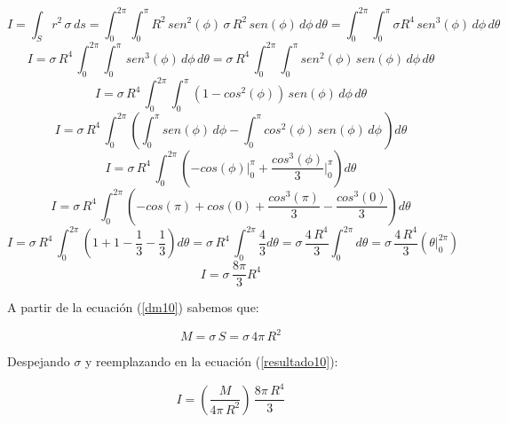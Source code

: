 \documentclass[letter,oneside,11pt]{article}
\begin{document}
\begin{equation*}
    I = \int_{S} r^2\, \sigma\, ds = \int_{0}^{2\pi} \int_{0}^{\pi} R^2\, sen^2(\phi)\, \sigma\, R^2\, sen (\phi)\, d\phi\, d\theta = \int_{0}^{2\pi} \int_{0}^{\pi} \sigma R^4\, sen^3(\phi)\, d\phi\, d\theta
\end{equation*}
\begin{equation*}
    I = \sigma\, R^4\, \int_{0}^{2\pi} \int_{0}^{\pi}\, sen^3(\phi)\, d\phi\, d\theta = \sigma\, R^4\, \int_{0}^{2\pi} \int_{0}^{\pi} sen^2(\phi)\, sen(\phi)\, d\phi\, d\theta
\end{equation*}
\begin{equation*}
    I = \sigma\, R^4\, \int_{0}^{2\pi} \int_{0}^{\pi} (1 - cos^2(\phi))\, sen(\phi)\, d\phi\, d\theta
\end{equation*}
\begin{equation*}
    I = \sigma\, R^4\, \int_{0}^{2\pi} \left( \int_{0}^{\pi} sen(\phi)\, d\phi - \int_{0}^{\pi} cos^2(\phi)\, sen(\phi)\, d\phi\, \right) d\theta
\end{equation*}
\begin{equation*}
    I = \sigma\, R^4\, \int_{0}^{2\pi} \left( -cos(\phi)\Biggr|_{0}^{\pi} + \frac{cos^3(\phi)}{3}\Biggr|_{0}^{\pi} \right) d\theta
\end{equation*}
\begin{equation*}
    I = \sigma\, R^4\, \int_{0}^{2\pi} \left( -cos(\pi) + cos(0) + \frac{cos^3(\pi)}{3} - \frac{cos^3(0)}{3} \right) d\theta
\end{equation*}
\begin{equation*}
    I = \sigma\, R^4\, \int_{0}^{2\pi} \left( 1 + 1 - \frac{1}{3} - \frac{1}{3} \right) d\theta = \sigma\, R^4\, \int_{0}^{2\pi} \frac{4}{3} d\theta = \sigma\, \frac{4\, R^4}{3} \int_{0}^{2\pi} d\theta = \sigma\, \frac{4\, R^4}{3} ( \theta \Biggr|_{0}^{2\pi} )
\end{equation*}
\begin{equation}
    I = \sigma\, \frac{8\pi}{3} R^4
\label{resultado8}
\end{equation}

A partir de la ecuación (\ref{dm10}) sabemos que:

\begin{equation*}
    M = \sigma\, S = \sigma\, 4\pi\, R^2
\end{equation*}

Despejando $\sigma$ y reemplazando en la ecuación (\ref{resultado10}):

\begin{equation*}
    I = (\frac{M}{4\pi\, R^2})\, \frac{8\pi\, R^4}{3}
\end{equation*}
\end{document}
